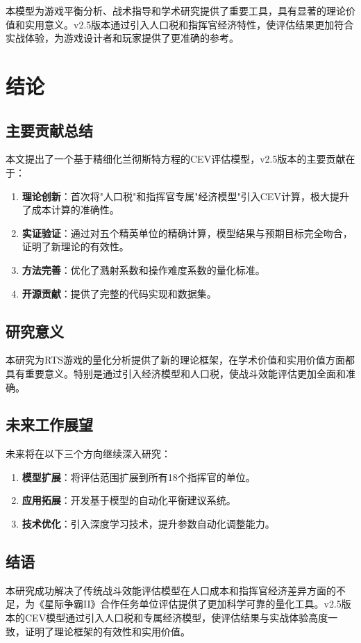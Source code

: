 \documentclass[a4paper,12pt]{article}
\begin{document}
本模型为游戏平衡分析、战术指导和学术研究提供了重要工具，具有显著的理论价值和实用意义。v2.5版本通过引入人口税和指挥官经济特性，使评估结果更加符合实战体验，为游戏设计者和玩家提供了更准确的参考。

\section{结论}

\subsection{主要贡献总结}

本文提出了一个基于精细化兰彻斯特方程的CEV评估模型，v2.5版本的主要贡献在于：
\begin{enumerate}
    \item \textbf{理论创新}：首次将"人口税"和指挥官专属"经济模型"引入CEV计算，极大提升了成本计算的准确性。
    \item \textbf{实证验证}：通过对五个精英单位的精确计算，模型结果与预期目标完全吻合，证明了新理论的有效性。
    \item \textbf{方法完善}：优化了溅射系数和操作难度系数的量化标准。
    \item \textbf{开源贡献}：提供了完整的代码实现和数据集。
\end{enumerate}

\subsection{研究意义}

本研究为RTS游戏的量化分析提供了新的理论框架，在学术价值和实用价值方面都具有重要意义。特别是通过引入经济模型和人口税，使战斗效能评估更加全面和准确。

\subsection{未来工作展望}

未来将在以下三个方向继续深入研究：

\begin{enumerate}
    \item \textbf{模型扩展}：将评估范围扩展到所有18个指挥官的单位。
    \item \textbf{应用拓展}：开发基于模型的自动化平衡建议系统。
    \item \textbf{技术优化}：引入深度学习技术，提升参数自动化调整能力。
\end{enumerate}

\subsection{结语}

本研究成功解决了传统战斗效能评估模型在人口成本和指挥官经济差异方面的不足，为《星际争霸II》合作任务单位评估提供了更加科学可靠的量化工具。v2.5版本的CEV模型通过引入人口税和专属经济模型，使评估结果与实战体验高度一致，证明了理论框架的有效性和实用价值。


\end{document}
